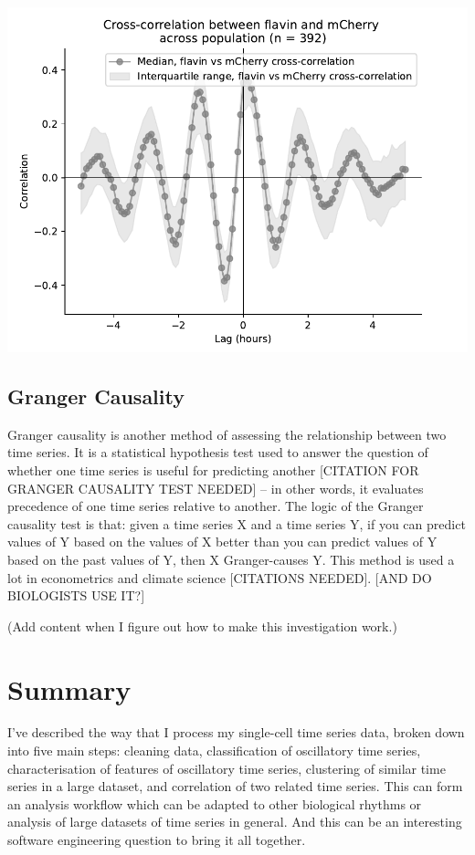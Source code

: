 \begin{enumerate}
\begin{enumerate}
\begin{center}
\includegraphics[width=.9\linewidth]{xcf.pdf}
\end{center}
\end{enumerate}
\end{enumerate}

\subsection{Granger Causality}
\label{sec:analysis-correlation-granger}

Granger causality is another method of assessing the relationship between two time series.
It is a statistical hypothesis test used to answer the question of whether one time series is useful for predicting another [CITATION FOR GRANGER CAUSALITY TEST NEEDED] -- in other words, it evaluates precedence of one time series relative to another.
The logic of the Granger causality test is that: given a time series X and a time series Y, if you can predict values of Y based on the values of X better than you can predict values of Y based on the past values of Y, then X Granger-causes Y.
This method is used a lot in econometrics and climate science [CITATIONS NEEDED].
[AND DO BIOLOGISTS USE IT?]

(Add content when I figure out how to make this investigation work.)

\section{Summary}
\label{sec:analysis-summary}

I've described the way that I process my single-cell time series data, broken down into five main steps: cleaning data, classification of oscillatory time series, characterisation of features of oscillatory time series, clustering of similar time series in a large dataset, and correlation of two related time series.
This can form an analysis workflow which can be adapted to other biological rhythms or analysis of large datasets of time series in general.
And this can be an interesting software engineering question to bring it all together.

